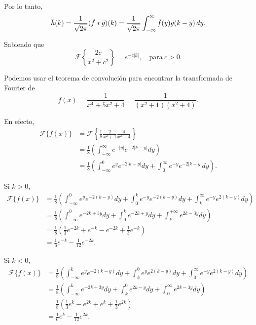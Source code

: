 \begin{demo}
\begin{itemize}
Por lo tanto,
$$\Tilde{h}(k) =  \frac{1}{\sqrt{2\pi}} (\Tilde{f} * \Tilde{g})(k) = \frac{1}{\sqrt{2\pi}} \int_{-\infty}^{\infty} \Tilde{f}(y) \Tilde{g}(k-y) \,dy.$$
\end{itemize}

\end{demo}


\begin{ejemplo}
    Sabiendo que \cite{Mauch}
    $$\mathcal{F}\left\{ \frac{2c}{x^2+c^2} \right\} = e^{-c|k|}, \quad \text{para} ~ c > 0.$$

    Podemos usar el teorema de convolución para encontrar la transformada de Fourier de
    \begin{equation}
      f(x) = \frac{1}{x^4+5x^2+4} = \frac{1}{(x^2+1)(x^2+4)}.    \label{EjConvo}
    \end{equation}
  
    En efecto,
    \begin{align*}
        \mathcal{F}\{f(x)\} &=  \mathcal{F}\left\{ \frac{1}{8} \frac{2}{x^2+1} \frac{4}{x^2+4} \right\} \\
        &= \frac{1}{8} \left( \int_{-\infty}^{\infty} e^{-|y|}e^{-2|k-y|} dy \right) \\
        &= \frac{1}{8} \left( \int_{-\infty}^0 e^{y}e^{-2|k-y|} dy +   \int_0^{\infty} e^{-y}e^{-2|k-y|} dy \right).
    \end{align*}

Si $k > 0$,
\begin{align*}
    \mathcal{F}\{f(x)\} &= \frac{1}{8} \left(  \int_{-\infty}^0 e^{y}e^{-2(k-y)} dy +  \int_0^k e^{-y}e^{-2(k-y)} dy + \int_k^{\infty} e^{-y}e^{2(k-y)} dy \right)  \\
    &= \frac{1}{8} \left(  \int_{-\infty}^0 e^{-2k+3y} dy +  \int_0^k e^{-2k+y} dy + \int_k^{+\infty} e^{2k-3y} dy \right) \\
    &= \frac{1}{8} \left( \frac{1}{3} e^{-2k} + e^{-k} - e^{-2k} + \frac{1}{3} e^{-k} \right) \\
    &= \frac{1}{6} e^{-k} - \frac{1}{12} e^{-2k}. 
\end{align*}

Si $k < 0$,
\begin{align*}
    \mathcal{F}\{f(x)\} &= \frac{1}{8} \left(  \int_{-\infty}^k e^{y}e^{-2(k-y)} dy +  \int_k^0 e^{y}e^{2(k-y)} dy + \int_0^{\infty} e^{-y}e^{2(k-y)} dy \right)  \\
    &= \frac{1}{8} \left(  \int_{-\infty}^k e^{-2k+3y} dy +  \int_k^0 e^{2k-y} dy + \int_0^{\infty} e^{2k-3y} dy \right) \\
    &= \frac{1}{8} \left( \frac{1}{3} e^{k} - e^{2k} + e^k + \frac{1}{3} e^{2k} \right) \\
    &= \frac{1}{6} e^{k} - \frac{1}{12} e^{2k}. 
\end{align*}


\end{ejemplo}
